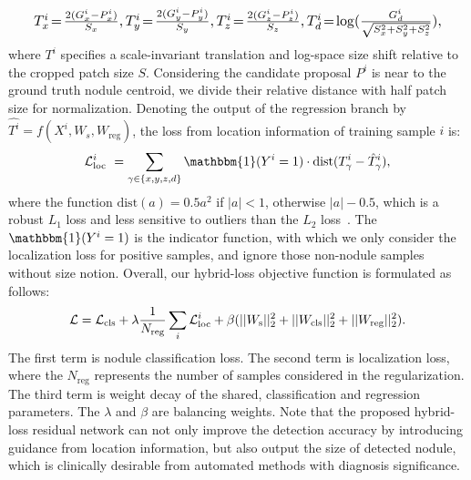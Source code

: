 \documentclass{llncs}
\begin{document}
\begin{equation}{\small}
\resizebox{0.93\textwidth}{!}{$
T^i_x \! = \! \frac{2(G^i_x-P^i_x)}{S_x},  T^i_y \! = \! \frac{2(G^i_y-P^i_y)}{S_y},   T^i_z \! = \! \frac{2(G^i_z-P^i_z)}{S_z}, 
T^i_d \! =  \! \log (\frac{G^i_d}{\sqrt{S_x^2+S_y^2+S_z^2}}),
$}
\vspace{-1mm}
\end{equation}
where $T^i$ specifies a scale-invariant translation and log-space size shift relative to the cropped patch size $S$.
Considering the candidate proposal $P^i$ is near to the ground truth nodule centroid, we divide their relative distance with half patch size for normalization.
Denoting the output of the regression branch by $\hat{T^i} \! = \! f(X^i,W_s,W_\text{reg})$,
the loss from location information of training sample $i$ is:
\vspace{-1mm}
\begin{equation}
\mathcal{L}^i_{\text{loc}} ~ = \sum_{\gamma \in \{x,y,z,d\}}  \mathbbm{1}(Y^i=1) \cdot \text{dist} (T^i_\gamma - \hat{T}^i_\gamma),
\vspace{-1mm}
\end{equation}
where the function $\text{dist}(a) = 0.5a^2$ if $|a|<1$, otherwise $|a|-0.5$, which is a robust $L_1$ loss and less sensitive to outliers than the $L_2$ loss~\cite{Girshick_2015_ICCV}.
The $\mathbbm{1}(Y^i=1)$ is the indicator function, with which we only consider the localization loss for positive samples, and ignore those non-nodule samples without size notion.
Overall, our hybrid-loss objective function is formulated as follows:
\vspace{-1mm}
\begin{equation}
\mathcal{L} = \mathcal{L}_{\text{cls}} + \lambda \frac{1}{N_{\text{reg}}} \sum_{i} \mathcal{L}^i_{\text{loc}} + \beta (||W_\text{s}||^2_2 + ||W_\text{cls}||^2_2 + ||W_\text{reg}||^2_2).
\vspace{-1mm}
\end{equation}
The first term is nodule classification loss.
The second term is localization loss, where the $N_{\text{reg}}$ represents the number of samples considered in the regularization.
The third term is weight decay of the shared, classification and regression parameters.
The $\lambda$ and $\beta$ are balancing weights.
Note that the proposed hybrid-loss residual network can not only improve the detection accuracy by introducing guidance from location information, but also output the size of detected nodule, which is clinically desirable from automated methods with diagnosis significance.
\end{document}
